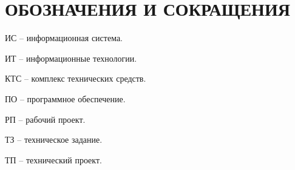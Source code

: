 \section*{ОБОЗНАЧЕНИЯ И СОКРАЩЕНИЯ}

ИС -- информационная система.

ИТ -- информационные технологии. 

КТС -- комплекс технических средств.

ПО -- программное обеспечение.

РП -- рабочий проект.

ТЗ -- техническое задание.

ТП -- технический проект.